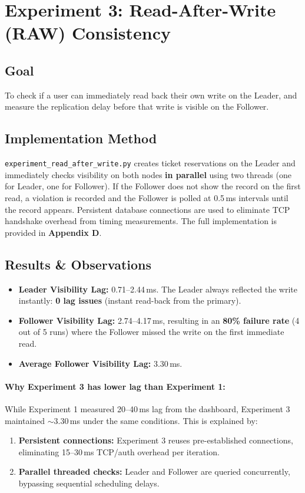 \documentclass[12pt]{article}
\begin{document}
\section{Experiment 3: Read-After-Write (RAW) Consistency}

\subsection{Goal}
To check if a user can immediately read back their own write on the Leader, and measure the replication delay before that write is visible on the Follower.

\subsection{Implementation Method}
\texttt{experiment\_read\_after\_write.py} creates ticket reservations on the Leader and immediately checks visibility on both nodes \textbf{in parallel} using two threads (one for Leader, one for Follower). If the Follower does not show the record on the first read, a violation is recorded and the Follower is polled at 0.5\,ms intervals until the record appears. Persistent database connections are used to eliminate TCP handshake overhead from timing measurements. The full implementation is provided in \textbf{Appendix D}.

\subsection{Results \& Observations}
\begin{itemize}
    \item \textbf{Leader Visibility Lag:} 0.71--2.44\,ms. The Leader always reflected the write instantly: \textbf{0 lag issues} (instant read-back from the primary).
    \item \textbf{Follower Visibility Lag:} 2.74--4.17\,ms, resulting in an \textbf{80\% failure rate} (4 out of 5 runs) where the Follower missed the write on the first immediate read.
    \item \textbf{Average Follower Visibility Lag:} 3.30\,ms.
\end{itemize}

\paragraph{Why Experiment 3 has lower lag than Experiment 1:}
While Experiment 1 measured 20--40\,ms lag from the dashboard, Experiment 3 maintained $\sim$3.30\,ms under the same conditions. This is explained by:
\begin{enumerate}
    \item \textbf{Persistent connections:} Experiment 3 reuses pre-established connections, eliminating 15--30\,ms TCP/auth overhead per iteration.
    \item \textbf{Parallel threaded checks:} Leader and Follower are queried concurrently, bypassing sequential scheduling delays.
\end{enumerate}
\end{document}
